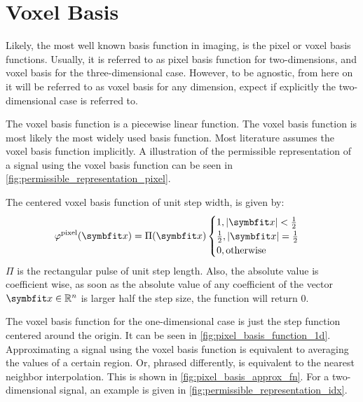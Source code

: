 \section{Voxel Basis}\label{sec:voxel_basis}

Likely, the most well known basis function in imaging, is the pixel or voxel basis functions.
Usually, it is referred to as pixel basis function for two-dimensions, and voxel basis for the
three-dimensional case. However, to be agnostic, from here on it will be referred to as voxel basis
for any dimension, expect if explicitly the two-dimensional case is referred to.

The voxel basis function is a piecewise linear function. The voxel basis function is most likely the
most widely used basis function. Most literature assumes the voxel basis function implicitly. A
illustration of the permissible representation of a signal using the voxel basis function can be
seen in \autoref{fig:permissible_representation_pixel}.

The centered voxel basis function of unit step width, is given by:
\begin{equation}\label{eq:voxel_basis_fn}
	\varphi^{\text{pixel}}(\mvec{x}) = \Pi(\mvec{x})
	\begin{cases}
		1, \abs{\mvec{x}} < \frac{1}{2}           \\
		\frac{1}{2}, \abs{\mvec{x}} = \frac{1}{2} \\
		0, \text{otherwise}
	\end{cases}
\end{equation}
\(\Pi\) is the rectangular pulse of unit step length. Also, the absolute value is coefficient wise,
as soon as the absolute value of any coefficient of the vector \(\mvec{x} \in \mathbb{R}^n\) is
larger half the step size, the function will return \(0\).

The voxel basis function for the one-dimensional case is just the step function centered around the
origin. It can be seen in \autoref{fig:pixel_basis_function_1d}. Approximating a signal using the
voxel basis function is equivalent to averaging the values of a certain region. Or, phrased
differently, is equivalent to the nearest neighbor interpolation. This is shown in
\autoref{fig:pixel_basis_approx_fn}. For a two-dimensional signal, an example is given in
\autoref{fig:permissible_representation_idx}.

